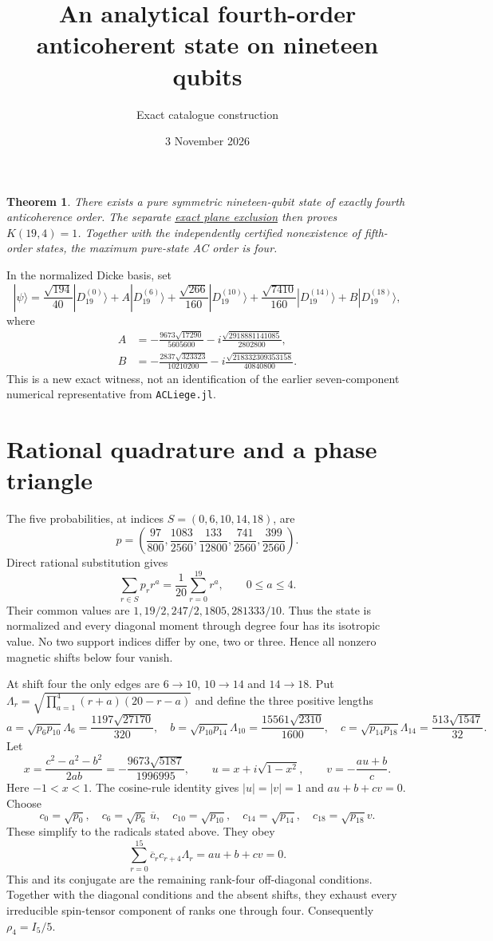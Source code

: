 \documentclass[11pt]{article}
\newtheorem{theorem}{Theorem}
\begin{document}
\title{An analytical fourth-order anticoherent state on nineteen qubits}
\author{Exact catalogue construction}
\date{3 November 2026}
\maketitle
\begin{theorem}
There exists a pure symmetric nineteen-qubit state of exactly fourth
anticoherence order. The separate \href{exclusion/proof.tex}{exact plane exclusion} then proves $K(19,4)=1$. Together with the independently certified
nonexistence of fifth-order states, the maximum pure-state AC order is four.
\end{theorem}
In the normalized Dicke basis, set
\[
 |\psi\rangle=\frac{\sqrt{194}}{40}|D_{19}^{(0)}\rangle
 +A|D_{19}^{(6)}\rangle+\frac{\sqrt{266}}{160}|D_{19}^{(10)}\rangle
 +\frac{\sqrt{7410}}{160}|D_{19}^{(14)}\rangle+B|D_{19}^{(18)}\rangle,
\]
where
\begin{align*}
 A&=-\frac{9673\sqrt{17290}}{5605600}
       -i\frac{\sqrt{2918881141085}}{2802800},\\
 B&=-\frac{2837\sqrt{323323}}{10210200}
       -i\frac{\sqrt{218332309353158}}{40840800}.
\end{align*}
This is a new exact witness, not an identification of the earlier
seven-component numerical representative from \texttt{ACLiege.jl}.

\section*{Rational quadrature and a phase triangle}
The five probabilities, at indices $S=(0,6,10,14,18)$, are
\[
 p=\left(\frac{97}{800},\frac{1083}{2560},\frac{133}{12800},
         \frac{741}{2560},\frac{399}{2560}\right).
\]
Direct rational substitution gives
\[
 \sum_{r\in S}p_r r^a=\frac1{20}\sum_{r=0}^{19}r^a,
 \qquad 0\le a\le4.
\]
Their common values are $1,19/2,247/2,1805,281333/10$.
Thus the state is normalized and every diagonal moment through degree
four has its isotropic value. No two support indices differ by one,
two or three. Hence all nonzero magnetic shifts below four vanish.

At shift four the only edges are $6\to10$, $10\to14$ and $14\to18$.
Put $\Lambda_r=\sqrt{\prod_{a=1}^4(r+a)(20-r-a)}$ and define the
three positive lengths
\[
 a=\sqrt{p_6p_{10}}\Lambda_6=\frac{1197\sqrt{27170}}{320},\quad
 b=\sqrt{p_{10}p_{14}}\Lambda_{10}=\frac{15561\sqrt{2310}}{1600},\quad
 c=\sqrt{p_{14}p_{18}}\Lambda_{14}=\frac{513\sqrt{1547}}{32}.
\]
Let
\[
 x=\frac{c^2-a^2-b^2}{2ab}=-\frac{9673\sqrt{5187}}{1996995},
 \qquad u=x+i\sqrt{1-x^2},\qquad v=-\frac{au+b}{c}.
\]
Here $-1<x<1$. The cosine-rule identity gives $|u|=|v|=1$
and $au+b+cv=0$. Choose
\[
 c_0=\sqrt{p_0},\quad c_6=\sqrt{p_6}\,\overline u,\quad
 c_{10}=\sqrt{p_{10}},\quad c_{14}=\sqrt{p_{14}},\quad
 c_{18}=\sqrt{p_{18}}v.
\]
These simplify to the radicals stated above. They obey
\[
 \sum_{r=0}^{15}\overline c_r c_{r+4}\Lambda_r=au+b+cv=0.
\]
This and its conjugate are the remaining rank-four off-diagonal
conditions. Together with the diagonal conditions and the absent shifts,
they exhaust every irreducible spin-tensor component of ranks one
through four. Consequently $\rho_4=I_5/5$.
\end{document}
